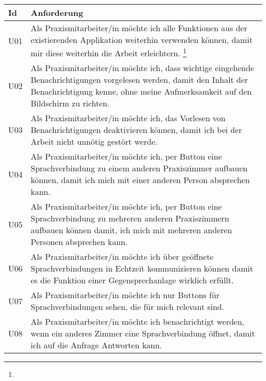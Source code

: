 \begin{table}[h]
    \centering
    \begin{tabular}{|l|p{15cm}|}
        \hline
        \textbf{Id} & \textbf{Anforderung}                                                                                                                                                                                      \\
        \hline
        U01           & Als Praxismitarbeiter/in möchte ich alle Funktionen aus der existierenden Applikation weiterhin verwenden können, damit mir diese weiterhin die Arbeit erleichtern. \footnote[2]{}                        \\
        \hline

        U02           & Als Praxismitarbeiter/in möchte ich, dass wichtige eingehende Benachrichtigungen vorgelesen werden, damit den Inhalt der Benachrichtigung kenne, ohne meine Aufmerksamkeit auf den Bildschirm zu richten. \\
        \hline
        U03           & Als Praxismitarbeiter/in möchte ich, das Vorlesen von Benachrichtigungen deaktivieren können, damit ich bei der Arbeit nicht unnötig gestört werde.                                                       \\
        \hline
        U04           & Als Praxismitarbeiter/in möchte ich, per Button eine Sprachverbindung zu einem anderen Praxiszimmer aufbauen können, damit ich mich mit einer anderen Person absprechen kann.                             \\
        \hline
        U05           & Als Praxismitarbeiter/in möchte ich, per Button eine Sprachverbindung zu mehreren anderen Praxiszimmern aufbauen können damit, ich mich mit mehreren anderen Personen absprechen kann.                    \\
        \hline
        U06           & Als Praxismitarbeiter/in möchte ich über geöffnete Sprachverbindungen in Echtzeit kommunizieren können damit es die Funktion einer Gegensprechanlage wirklich erfüllt.                                    \\
        \hline
        U07           & Als Praxismitarbeiter/in möchte ich nur Buttons für Sprachverbindungen sehen, die für mich relevant sind.                                                                                                 \\
        \hline
        U08           & Als Praxismitarbeiter/in möchte ich benachrichtigt werden, wenn ein anderes Zimmer eine Sprachverbindung öffnet, damit ich auf die Anfrage Antworten kann.                                                \\

\end{tabular}
\end{table}
